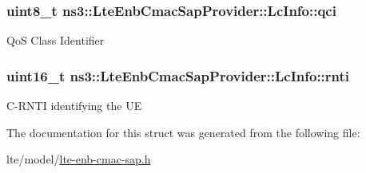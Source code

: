 \subsubsection[{\texorpdfstring{qci}{qci}}]{\setlength{\rightskip}{0pt plus 5cm}uint8\+\_\+t ns3\+::\+Lte\+Enb\+Cmac\+Sap\+Provider\+::\+Lc\+Info\+::qci}\hypertarget{structns3_1_1LteEnbCmacSapProvider_1_1LcInfo_a02e6137db57dec3c10c9c03f4df1b109}{}\label{structns3_1_1LteEnbCmacSapProvider_1_1LcInfo_a02e6137db57dec3c10c9c03f4df1b109}
QoS Class Identifier 
\subsubsection[{\texorpdfstring{rnti}{rnti}}]{\setlength{\rightskip}{0pt plus 5cm}uint16\+\_\+t ns3\+::\+Lte\+Enb\+Cmac\+Sap\+Provider\+::\+Lc\+Info\+::rnti}\hypertarget{structns3_1_1LteEnbCmacSapProvider_1_1LcInfo_a6f1d91aecf5d18a79929328856e8ab47}{}\label{structns3_1_1LteEnbCmacSapProvider_1_1LcInfo_a6f1d91aecf5d18a79929328856e8ab47}
C-\/\+R\+N\+TI identifying the UE 

The documentation for this struct was generated from the following file\+:\begin{DoxyCompactItemize}
\item 
lte/model/\hyperlink{lte-enb-cmac-sap_8h}{lte-\/enb-\/cmac-\/sap.\+h}\end{DoxyCompactItemize}
